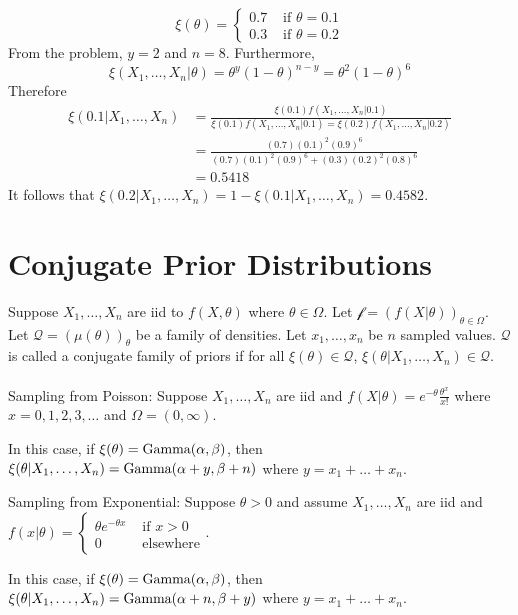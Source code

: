 \documentclass[12pt]{article}
\begin{document}
$$\xi(\theta) = \begin{cases} 0.7 &\text{ if } \theta = 0.1 \\ 0.3 &\text{ if } \theta = 0.2 \end{cases} $$ 
From the problem, $y = 2$ and $n= 8$. Furthermore, $$ \xi(X_1,\dots,X_n | \theta) = \theta^y(1-\theta)^{n-y} = \theta^2(1-\theta)^6$$ 
Therefore $$ \begin{aligned} \xi(0.1 | X_1,\dots, X_n) &= \frac{\xi(0.1)f(X_1,\dots,X_n | 0.1)}{\xi(0.1)f(X_1,\dots,X_n | 0.1) = \xi(0.2)f(X_1,\dots,X_n | 0.2)} \\ &= \frac{ (0.7)(0.1)^2(0.9)^6}{(0.7)(0.1)^2(0.9)^6 + (0.3)(0.2)^2(0.8)^6} \\ &= 0.5418 \end{aligned} $$ 
It follows that $\xi(0.2 | X_1,\dots, X_n) = 1- \xi(0.1 | X_1,\dots,X_n) = 0.4582$. 

\section{Conjugate Prior Distributions} 

Suppose $X_1,\dots, X_n$ are iid to $f(X,\theta)$ where $\theta \in \Omega$. Let $\mathcal{f} = (f(X|\theta))_{\theta \in \Omega}$. Let $\mathcal{Q} = (\mu(\theta))_\theta$ be a family of densities. Let $x_1,\dots,x_n$ be $n$ sampled values. $\mathcal{Q}$ is called a conjugate family of priors if for all $\xi(\theta) \in \mathcal{Q}$, $\xi(\theta | X_1,\dots, X_n) \in \mathcal{Q}$. \\~\\
Sampling from Poisson: Suppose $X_1,\dots,X_n$ are iid and $f(X|\theta) = e^{-\theta}\frac{\theta^x}{x!}$ where $x = 0,1,2,3,\dots$ and $\Omega = (0,\infty)$. 
\begin{theorem} In this case, if $\xi(\theta) = \text{Gamma}( \alpha,\beta )$, then $\xi(\theta| X_1,\dots,X_n) = \text{Gamma}( \alpha + y, \beta + n )$ where $y = x_1 + \dots + x_n$. \end{theorem} 

Sampling from Exponential: Suppose $\theta > 0$ and assume $X_1,\dots,X_n$ are iid and $f(x|\theta) = \begin{cases} \theta e^{-\theta x} &\text{ if } x > 0 \\ 0 &\text{ elsewhere} \end{cases}$. 
\begin{theorem} In this case, if $\xi(\theta) = \text{Gamma}( \alpha,\beta )$, then $\xi(\theta | X_1,\dots,X_n) = \text{Gamma}( \alpha + n, \beta + y )$ where $y = x_1 + \dots + x_n$. \end{theorem} 
\end{document}
